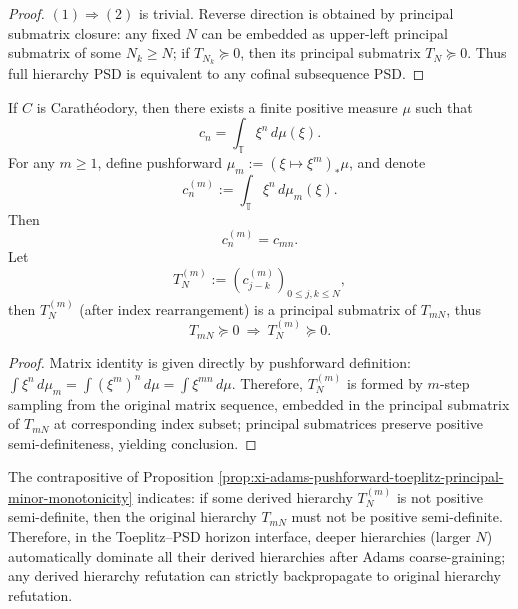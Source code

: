 \begin{proof}
\((1)\Rightarrow(2)\) is trivial.
Reverse direction is obtained by principal submatrix closure: any fixed \(N\) can be embedded as upper-left principal submatrix of some \(N_k\ge N\); if \(T_{N_k}\succeq 0\), then its principal submatrix \(T_N\succeq 0\).
Thus full hierarchy PSD is equivalent to any cofinal subsequence PSD.
\end{proof}



\begin{proposition}\label{prop:xi-adams-pushforward-toeplitz-principal-minor-monotonicity}
If \(C\) is Carathéodory, then there exists a finite positive measure \(\mu\) such that
\[
c_n=\int_{\mathbb T}\xi^n\,d\mu(\xi).
\]
For any \(m\ge 1\), define pushforward \(\mu_m:=(\xi\mapsto \xi^m)_\ast\mu\), and denote
\[
c_n^{(m)}:=\int_{\mathbb T}\xi^n\,d\mu_m(\xi).
\]
Then
\[
c_n^{(m)}=c_{mn}.
\]
Let
\[
T_N^{(m)}:=(c^{(m)}_{j-k})_{0\le j,k\le N},
\]
then \(T_N^{(m)}\) (after index rearrangement) is a principal submatrix of \(T_{mN}\), thus
\[
T_{mN}\succeq 0\ \Longrightarrow\ T_N^{(m)}\succeq 0.
\]
\end{proposition}

\begin{proof}
Matrix identity is given directly by pushforward definition:
\(
\int \xi^n\,d\mu_m=\int (\xi^m)^n\,d\mu=\int \xi^{mn}\,d\mu
\).
Therefore, \(T_N^{(m)}\) is formed by \(m\)-step sampling from the original matrix sequence, embedded in the principal submatrix of \(T_{mN}\) at corresponding index subset; principal submatrices preserve positive semi-definiteness, yielding conclusion.
\end{proof}

\begin{remark}\label{rem:xi-adams-toeplitz-no-info-increase}
The contrapositive of Proposition \ref{prop:xi-adams-pushforward-toeplitz-principal-minor-monotonicity} indicates: if some derived hierarchy \(T_N^{(m)}\) is not positive semi-definite, then the original hierarchy \(T_{mN}\) must not be positive semi-definite.
Therefore, in the Toeplitz--PSD horizon interface, deeper hierarchies (larger \(N\)) automatically dominate all their derived hierarchies after Adams coarse-graining; any derived hierarchy refutation can strictly backpropagate to original hierarchy refutation.
\end{remark}

